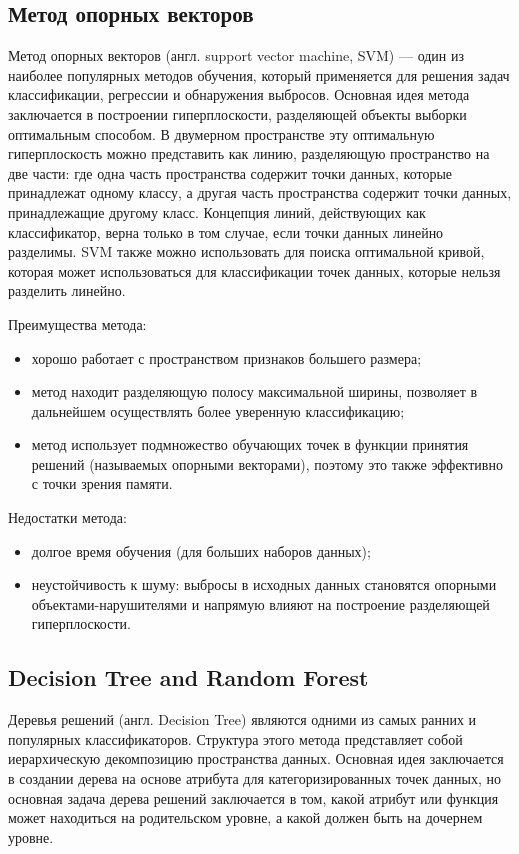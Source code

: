 \subsection{Метод опорных векторов}
Метод опорных векторов (англ. support vector machine, SVM) --- один из наиболее популярных методов обучения, который применяется для решения задач классификации, регрессии и обнаружения выбросов. Основная идея метода заключается в построении гиперплоскости, разделяющей объекты выборки оптимальным способом. В двумерном пространстве эту оптимальную гиперплоскость можно представить как линию, разделяющую пространство на две части: где одна часть пространства содержит точки данных, которые принадлежат одному классу, а другая часть пространства содержит точки данных, принадлежащие другому класс. Концепция линий, действующих как классификатор, верна только в том случае, если точки данных линейно разделимы. SVM также можно использовать для поиска оптимальной кривой, которая может использоваться для классификации точек данных, которые нельзя разделить линейно.


Преимущества метода:
\begin{itemize}[label = ---]
	\item хорошо работает с пространством признаков большего размера;
	\item метод находит разделяющую полосу максимальной ширины, позволяет в дальнейшем осуществлять более уверенную классификацию;
    \item метод использует подмножество обучающих точек в функции принятия решений (называемых опорными векторами), поэтому это также эффективно с точки зрения памяти.
\end{itemize}

Недостатки метода:
\begin{itemize}[label = ---]
	\item долгое время обучения (для больших наборов данных);
	\item неустойчивость к шуму: выбросы в исходных данных становятся опорными объектами-нарушителями и напрямую влияют на построение разделяющей гиперплоскости.
\end{itemize}

\subsection{Decision Tree and Random Forest}
Деревья решений (англ. Decision Tree) являются одними из самых ранних и популярных классификаторов\cite{45}. Структура этого метода представляет собой иерархическую декомпозицию пространства данных\cite{7}. Основная идея заключается в создании дерева на основе атрибута для категоризированных точек данных, но основная задача дерева решений заключается в том, какой атрибут или функция может находиться на родительском уровне, а какой должен быть на дочернем уровне\cite{161}.

